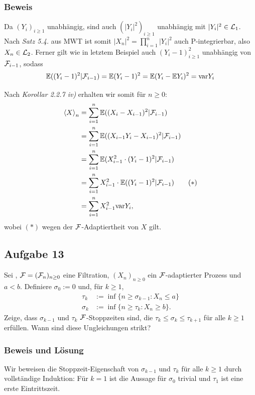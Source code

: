 \documentclass[12pt]{scrartcl}
\begin{document}
\subsubsection*{Beweis}
\einruecken

Da $(Y_i)_{i\ge 1}$ unabhängig, sind auch $(|Y_i|^2)_{i\ge 1}$ unabhängig mit $|Y_i|^2\in\mathcal{L}_1$.
Nach \textit{Satz 5.4.} aus MWT ist somit $|X_n|^2=\prod_{i=1}^n |Y_i|^2$ auch P-integrierbar, also $X_n\in\mathcal{L}_2$.
Ferner gilt wie in letztem Beispiel auch $(Y_i-1)^2_{i\ge 1}$ unabhängig von $\mathcal{F}_{i-1}$, sodass
$$\mathbb{E}((Y_i-1)^2|\mathcal{F}_{i-1})=\mathbb{E}(Y_i-1)^2=\mathbb{E}(Y_i-\mathbb{E} Y_i)^2=\text{var} Y_i$$

Nach \textit{Korollar 2.2.7 iv)} erhalten wir somit für $n\ge 0$:
\begin{align*}
\left<X\right>_n
&= \sum_{i=1}^n \E((X_i-X_{i-1})^2|\F_{i-1}) \\%
&= \sum_{i=1}^n \E((X_{i-1}Y_i - X_{i-1})^2|\F_{i-1}) \\
&= \sum_{i=1}^n \E(X_{i-1}^2\cdot(Y_i-1)^2|\F_{i-1}) \\
&= \sum_{i=1}^n X_{i-1}^2\cdot\E((Y_i-1)^2|\F_{i-1}) \tag{$\ast$} \\
&= \sum_{i=1}^n X_{i-1}^2\var Y_i,
\end{align*}
wobei $(\ast)$ wegen der $\mathcal{F}$-Adaptiertheit von $X$ gilt.

\ausruecken

\subsection*{Aufgabe 13}

Sei \WraumAnn, $\mathcal{F}=(\mathcal{F}_n)_{n\ge 0}$ eine Filtration, $(X_n)_{n\ge 0}$ ein $\mathcal{F}$-adaptierter Prozess und $a<b$. Definiere $\sigma_0:=0$ und, für $k\ge 1$,
\begin{align*}
\tau_k &:= \inf\{n\ge\sigma_{k-1}:X_n\le a\} \\
\sigma_k &:= \inf\{n\ge\tau_k:X_n\ge b\}.
\end{align*}
Zeige, dass $\sigma_{k-1}$ und $\tau_k$ $\mathcal{F}$-Stoppzeiten sind, die $\tau_k\le\sigma_k\le\tau_{k+1}$ für alle $k\ge 1$ erfüllen.
Wann sind diese Ungleichungen strikt?

\subsubsection*{Beweis und Lösung}
\einruecken

Wir beweisen die Stoppzeit-Eigenschaft von $\sigma_{k-1}$ und $\tau_k$ für alle $k\ge 1$ durch vollständige Induktion: Für $k=1$ ist die Aussage für $\sigma_0$ trivial und $\tau_1$ ist eine erste Eintrittszeit.
\end{document}

